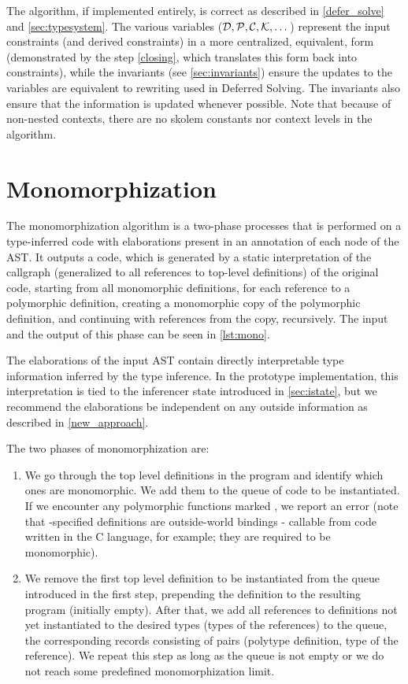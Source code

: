 The algorithm, if implemented entirely, is correct as described in \cref{defer_solve} and \cref{sec:typesystem}. The various variables ($\mathcal D, \mathcal P, \mathcal C, \mathcal K, \dots$) represent the input constraints (and derived constraints) in a more centralized, equivalent, form (demonstrated by the step \ref{closing}, which translates this form back into constraints), while the invariants (see \cref{sec:invariants}) ensure the updates to the variables are equivalent to rewriting used in Deferred Solving. The invariants also ensure that the information is updated whenever possible. Note that because of non-nested contexts, there are no skolem constants nor context levels in the algorithm.

\section{Monomorphization}

The monomorphization algorithm is a two-phase processes that is performed on a type-inferred code with elaborations present in an annotation of each node of the AST. It outputs a code, which is generated by a static interpretation of the callgraph (generalized to all references to top-level definitions) of the original code, starting from all monomorphic definitions, for each reference to a polymorphic definition, creating a monomorphic copy of the polymorphic definition, and continuing with references from the copy, recursively. The input and the output of this phase can be seen in \cref{lst:mono}.

The elaborations of the input AST contain directly interpretable type information inferred by the type inference. In the prototype implementation, this interpretation is tied to the inferencer state introduced in \cref{sec:istate}, but we recommend the elaborations be independent on any outside information as described in \cref{new_approach}.

The two phases of monomorphization are:

\begin{enumerate}
    \item We go through the top level definitions in the program and identify which ones are monomorphic. We add them to the queue of code to be instantiated. If we encounter any polymorphic functions marked , we report an error (note that -specified definitions are outside-world bindings - callable from code written in the C language, for example; they are required to be monomorphic).

    \item We remove the first top level definition to be instantiated from the queue introduced in the first step, prepending the definition to the resulting program (initially empty). After that, we add all references to  definitions not yet instantiated to the desired types (types of the references) to the queue, the corresponding records consisting of pairs (polytype definition, type of the reference). We repeat this step as long as the queue is not empty or we do not reach some predefined monomorphization limit. \label{steptwo}
\end{enumerate}

